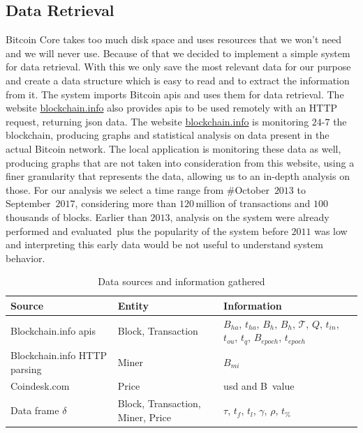 \documentclass[USenglish]{uit-thesis}
\def\bitcoin{\leavevmode\rlap{\hskip.5pt-}B}
\begin{document}
\subsection{Data Retrieval}
\label{sec:dataretrieval}
Bitcoin Core takes too much disk space and uses resources
that we won't need and we will never use. Because of that we
decided to implement a simple system for data retrieval.
With this we only save the most relevant data
for our purpose and create a data structure which
is easy to read and to extract the information from it.
The system imports Bitcoin \gls{api}s and uses
them for data retrieval. The website \url{blockchain.info}
also provides \gls{api}s to be used remotely with an
HTTP request, returning \gls{json} data.
The website \url{blockchain.info} is monitoring $24$-$7$ the blockchain,
producing graphs and
statistical analysis on data present in the
actual Bitcoin network. The local
application is monitoring these data as well,
producing graphs that are not taken into
consideration from this website,
using a finer granularity that represents
the data, allowing us to an in-depth analysis
on those.
For our analysis we select a time range from \#October~$2013$ to
September~$2017$, considering more than $120$\,million of transactions
and $100$\,thousands of blocks. Earlier than $2013$, analysis
on the system were already performed and
evaluated\,\cite{croman2016, houy2014EOBTF,
	Moser2015, Rizun:2015:blocksizelimit}
plus the popularity of the system before
$2011$ was low and interpreting this early data would
be not useful to understand system behavior.
\begin{table}
	\centering
		\caption{Data sources and information gathered}
		\label{tab:datasources}
	\begin{tabular}{|p{3cm}p{3cm}p{4cm}|} \hline
			\textbf{Source}&\textbf{Entity}& \textbf{Information}\\
			\hline
			Blockchain.info \gls{api}s&Block, Transaction&$B_{ha}$, $t_{ha}$, $B_h$, $B_h$, $\mathcal{T}$, $Q$, $t_{in}$, $t_{ou}$, $t_q$, $B_{epoch}$, $t_{epoch}$\\
			\hline
			Blockchain.info HTTP parsing&Miner& $B_{mi}$\\
			\hline
			Coindesk.com&Price&\gls{usd} and \bitcoin~value\\
			\hline
			Data frame $\delta$&Block, Transaction, Miner, Price&$\tau$, $t_f$, $t_l$, $\gamma$, $\rho$, $t_\%$\\
			\hline
		\end{tabular}
\end{table}
\end{document}
